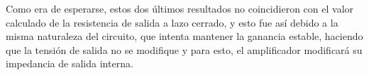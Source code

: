 Como era de esperarse, estos dos últimos resultados no coincidieron con el valor calculado de la resistencia de salida a lazo cerrado, y esto fue así debido a la misma naturaleza del circuito, que intenta mantener la ganancia estable, haciendo que la tensión de salida no se modifique y para esto, el amplificador modificará su impedancia de salida interna.